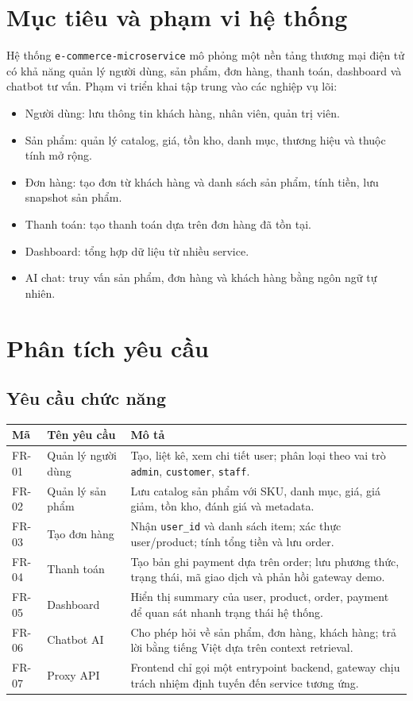 \documentclass[12pt,a4paper]{report}
\begin{document}
\section{Mục tiêu và phạm vi hệ thống}
Hệ thống \texttt{e-commerce-microservice} mô phỏng một nền tảng thương mại điện tử có khả năng quản lý người dùng, sản phẩm, đơn hàng, thanh toán, dashboard và chatbot tư vấn. Phạm vi triển khai tập trung vào các nghiệp vụ lõi:
\begin{itemize}
  \item Người dùng: lưu thông tin khách hàng, nhân viên, quản trị viên.
  \item Sản phẩm: quản lý catalog, giá, tồn kho, danh mục, thương hiệu và thuộc tính mở rộng.
  \item Đơn hàng: tạo đơn từ khách hàng và danh sách sản phẩm, tính tiền, lưu snapshot sản phẩm.
  \item Thanh toán: tạo thanh toán dựa trên đơn hàng đã tồn tại.
  \item Dashboard: tổng hợp dữ liệu từ nhiều service.
  \item AI chat: truy vấn sản phẩm, đơn hàng và khách hàng bằng ngôn ngữ tự nhiên.
\end{itemize}

\section{Phân tích yêu cầu}
\subsection{Yêu cầu chức năng}
\begin{longtable}{p{2.6cm}p{4.2cm}p{6.6cm}}
\toprule
\textbf{Mã} & \textbf{Tên yêu cầu} & \textbf{Mô tả} \\
\midrule
FR-01 & Quản lý người dùng & Tạo, liệt kê, xem chi tiết user; phân loại theo vai trò \texttt{admin}, \texttt{customer}, \texttt{staff}. \\
FR-02 & Quản lý sản phẩm & Lưu catalog sản phẩm với SKU, danh mục, giá, giá giảm, tồn kho, đánh giá và metadata. \\
FR-03 & Tạo đơn hàng & Nhận \texttt{user\_id} và danh sách item; xác thực user/product; tính tổng tiền và lưu order. \\
FR-04 & Thanh toán & Tạo bản ghi payment dựa trên order; lưu phương thức, trạng thái, mã giao dịch và phản hồi gateway demo. \\
FR-05 & Dashboard & Hiển thị summary của user, product, order, payment để quan sát nhanh trạng thái hệ thống. \\
FR-06 & Chatbot AI & Cho phép hỏi về sản phẩm, đơn hàng, khách hàng; trả lời bằng tiếng Việt dựa trên context retrieval. \\
FR-07 & Proxy API & Frontend chỉ gọi một entrypoint backend, gateway chịu trách nhiệm định tuyến đến service tương ứng. \\
\bottomrule
\end{longtable}
\end{document}
